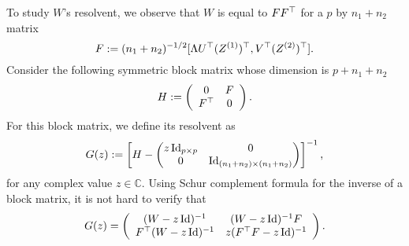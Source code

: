 To study $W$'s resolvent, we observe that $W$ is equal to $FF^{\top}$ for a $p$ by $n_1 + n_2$ matrix
	\[ F := (n_1+ n_2)^{-1/2} [\Lambda U^\top (Z^{(1)})^\top,V^\top (Z^{(2)})^\top]. \]
Consider the following symmetric block matrix whose dimension is $p + n_1 + n_2$
 \begin{equation}\label{linearize_block}
    H \define \left( {\begin{array}{*{20}c}
   0 & \AF  \\
   \AF^{\top} & 0
   \end{array}} \right).
 \end{equation}
For this block matrix, we define its resolvent as
$$G(z) := \left[H - \begin{pmatrix}z\operatorname{Id}_{p\times p}&0\\ 0 & \operatorname{Id}_{(n_1+n_2)\times (n_1+n_2)} \end{pmatrix}\right]^{-1},$$ 
for any complex value $z\in \mathbb C$.
Using Schur complement formula for the inverse of a block matrix, it is not hard to verify that
	\begin{equation*} %
	  G(z) =  \left( {\begin{array}{*{20}c}
			(W- z\id)^{-1} & (W - z\id)^{-1} \AF  \\
      \AF^\top (W - z\id)^{-1} & z(\AF^\top \AF - z\id)^{-1}
		\end{array}} \right).%
  \end{equation*}

